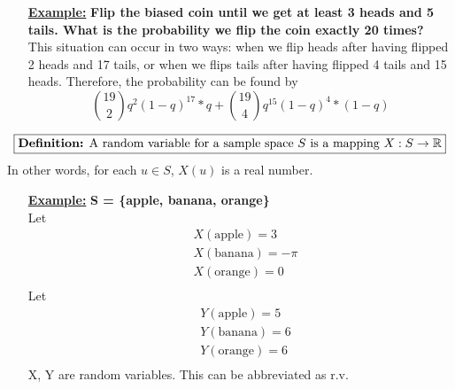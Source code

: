 \documentclass[10pt]{article}
\begin{document}
\begin{flushleft}
\begin{itemize}
\item[\textbf{\underline{Example:}}] \textbf{Flip the biased coin until we get
    at least 3 heads and 5 tails. What is the probability we flip the coin
exactly 20 times?} \\
This situation can occur in two ways: when we flip heads after having flipped 2
heads and 17 tails, or when we flips tails after having flipped 4 tails and 15
heads. Therefore, the probability can be found by
$$ \binom{19}{2}q^2(1 - q)^{17} * q + \binom{19}{4}q^{15}(1 - q)^4 * (1 - q) $$
\end{itemize}

$$\boxed{ \text{\textbf{Definition:} A random variable for a sample space } S
    \text{ is a mapping }
X: S \rightarrow \mathbb{R}}$$
In other words, for  each $u \in S$, $X(u)$ is a real number.

\begin{itemize}
    \item[\textbf{\underline{Example:}}] \textbf{S = \{apple, banana, orange\}}
        \\
        Let
        $$ \begin{aligned}
            &X(\text{apple}) = 3 \\
            &X(\text{banana}) = -\pi \\
            &X(\text{orange}) = 0 \\
        \end{aligned} $$
        Let
        $$ \begin{aligned}
            &Y(\text{apple}) = 5 \\
            &Y(\text{banana}) = 6 \\
            &Y(\text{orange}) = 6 \\
        \end{aligned} $$
        X, Y are random variables. This can be abbreviated as r.v.


\end{itemize}
\end{flushleft}
\end{document}
